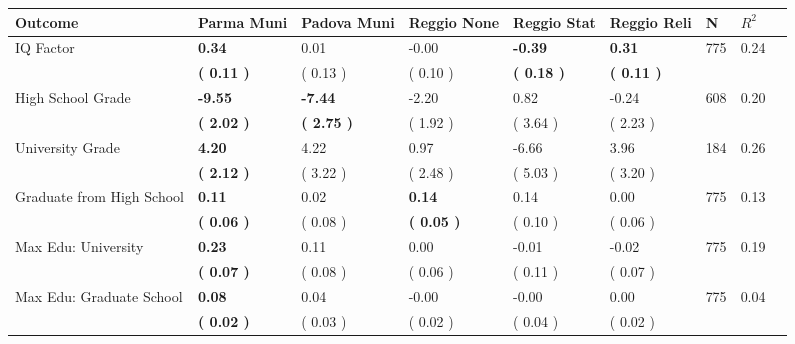 \begin{tabular}{L{6.2cm} C{1.8cm} C{1.8cm} C{1.8cm} C{1.8cm} C{1.8cm} C{1.8cm} C{0.3cm} C{0.3cm}}
\toprule
 \textbf{Outcome} & \textbf{Parma Muni} & \textbf{Padova Muni} & \textbf{Reggio None} & \textbf{Reggio Stat} & \textbf{Reggio Reli} & \textbf{N} & \textbf{$ R^2$} \\
\midrule
IQ Factor & \textbf{     0.34} &      0.01 &     -0.00 & \textbf{    -0.39} & \textbf{     0.31}  & 775 &       0.24 \\ 
 & \textbf{(     0.11 )} & (     0.13 ) & (     0.10 ) & \textbf{(     0.18 )} & \textbf{(     0.11 )}  & \\
High School Grade & \textbf{    -9.55} & \textbf{    -7.44} &     -2.20 &      0.82 &     -0.24  & 608 &       0.20 \\ 
 & \textbf{(     2.02 )} & \textbf{(     2.75 )} & (     1.92 ) & (     3.64 ) & (     2.23 )  & \\
University Grade & \textbf{     4.20} &      4.22 &      0.97 &     -6.66 &      3.96  & 184 &       0.26 \\ 
 & \textbf{(     2.12 )} & (     3.22 ) & (     2.48 ) & (     5.03 ) & (     3.20 )  & \\
Graduate from High School & \textbf{     0.11} &      0.02 & \textbf{     0.14} &      0.14 &      0.00  & 775 &       0.13 \\ 
 & \textbf{(     0.06 )} & (     0.08 ) & \textbf{(     0.05 )} & (     0.10 ) & (     0.06 )  & \\
Max Edu: University & \textbf{     0.23} &      0.11 &      0.00 &     -0.01 &     -0.02  & 775 &       0.19 \\ 
 & \textbf{(     0.07 )} & (     0.08 ) & (     0.06 ) & (     0.11 ) & (     0.07 )  & \\
Max Edu: Graduate School & \textbf{     0.08} &      0.04 &     -0.00 &     -0.00 &      0.00  & 775 &       0.04 \\ 
 & \textbf{(     0.02 )} & (     0.03 ) & (     0.02 ) & (     0.04 ) & (     0.02 )  & \\
\bottomrule
\end{tabular}
